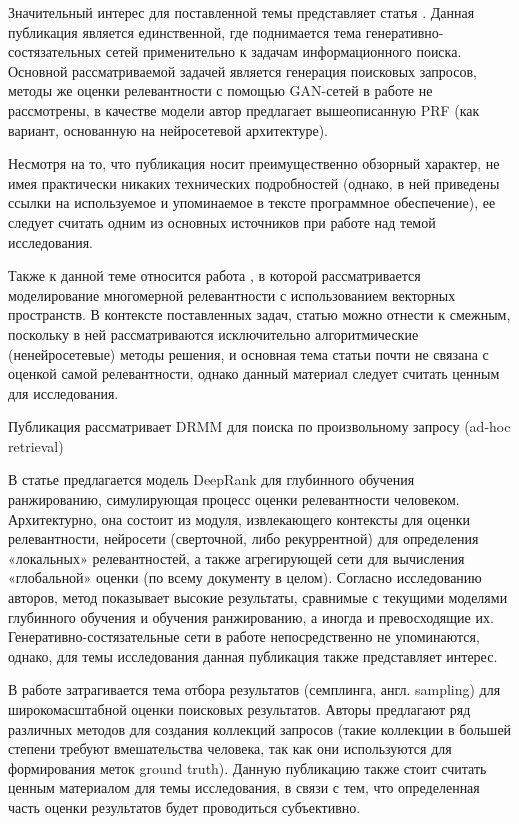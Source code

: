 Значительный интерес для поставленной темы представляет статья \cite{DBLP:journals/corr/abs-1806-03577}. Данная публикация
является единственной, где поднимается тема генеративно-состязательных сетей применительно к задачам информационного поиска.
Основной рассматриваемой задачей является генерация поисковых запросов, методы же оценки релевантности с помощью GAN-сетей 
в работе не рассмотрены, в качестве модели автор предлагает вышеописанную PRF (как вариант, основанную на нейросетевой 
архитектуре).

Несмотря на то, что публикация \cite{DBLP:journals/corr/abs-1806-03577} носит преимущественно обзорный характер, не имея
практически никаких технических подробностей (однако, в ней приведены ссылки на используемое и упоминаемое в тексте 
программное обеспечение), ее следует считать одним из основных источников при работе над темой исследования.

Также к данной теме относится работа \cite{DBLP:journals/corr/abs-1805-02184}, в которой рассматривается моделирование 
многомерной релевантности с использованием векторных пространств. В контексте поставленных задач, статью можно отнести
к смежным, поскольку в ней рассматриваются исключительно алгоритмические (ненейросетевые) методы решения, и основная тема
статьи почти не связана с оценкой самой релевантности, однако данный материал следует считать ценным для исследования.

Публикация \cite{DBLP:journals/corr/abs-1711-08611} рассматривает DRMM для поиска по произвольному запросу (ad-hoc retrieval)

В статье \cite{DBLP:journals/corr/abs-1710-05649} предлагается модель DeepRank для глубинного обучения ранжированию, 
симулирующая процесс оценки релевантности человеком. Архитектурно, она состоит из модуля, извлекающего контексты для оценки
релевантности, нейросети (сверточной, либо рекуррентной) для определения «локальных» релевантностей, а также агрегирующей
сети для вычисления «глобальной» оценки (по всему документу в целом). Согласно исследованию авторов, метод показывает высокие
результаты, сравнимые с текущими моделями глубинного обучения и обучения ранжированию, а иногда и превосходящие их.
Генеративно-состязательные сети в работе непосредственно не упоминаются, однако, для темы исследования данная публикация 
также представляет интерес.

В работе \cite{DBLP:journals/corr/abs-1709-01709} затрагивается тема отбора результатов (семплинга, англ. sampling)
для широкомасштабной оценки поисковых результатов. Авторы предлагают ряд различных методов для создания коллекций запросов
(такие коллекции в большей степени требуют вмешательства человека, так как они используются для формирования меток
ground truth). Данную публикацию также стоит считать ценным материалом для темы исследования, в связи с тем, 
что определенная часть оценки результатов будет проводиться субъективно.